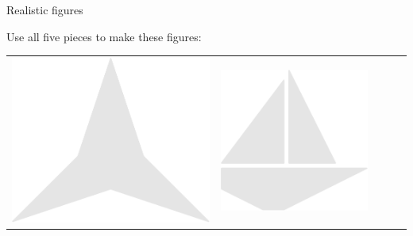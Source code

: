\documentclass[14pt]{beamer}
\begin{document}
    \begin{frame}{Realistic figures}
        \vspace{-1em}
        \begin{center}
            \quad Use all five pieces to make these figures:

            \vspace{0.5em}

            {\footnotesize
            \begin{tabular}{ccccc}
                \!\!\includegraphics[scale=0.20]{figures/figure026bc.pdf} \!\!&
                \!\!\includegraphics[scale=0.20]{figures/figure026c.pdf}  \!\!&

\end{tabular}}
\end{center}
\end{frame}
\end{document}
